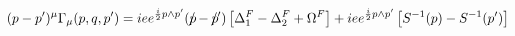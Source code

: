 \begin{equation}
(p-p')^{\mu}\Gamma_{\mu}(p,q,p')=iee^{\frac{i}{2}p\wedge
p'}(p\hspace{-0.2cm}/-p\hspace{-0.2cm}/')\left[\Delta_{1}^{F}-\Delta_{2}^{F}+\Omega^{F}\right]+iee^{\frac{i}{2}p\wedge
p'}\left[S^{-1}(p)-S^{-1}(p')\right]
\end{equation}

